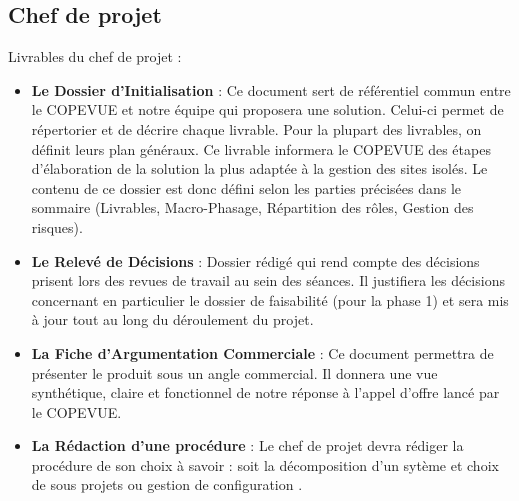     \subsection{Chef de projet}
Livrables du chef de projet :
\begin{itemize}
\item \textbf{Le Dossier d'Initialisation} : Ce document sert de référentiel commun entre le COPEVUE et notre équipe qui proposera une solution. Celui-ci permet de répertorier et de décrire chaque livrable. Pour la plupart des livrables, on définit leurs plan généraux. Ce livrable informera le COPEVUE des étapes d’élaboration de la solution la plus adaptée à la gestion des sites isolés. Le contenu de ce dossier est donc défini selon les parties précisées dans le sommaire (Livrables, Macro-Phasage, Répartition des rôles, Gestion des risques).
\item \textbf{Le Relevé de Décisions} : Dossier rédigé qui rend compte des décisions prisent lors des revues de travail au sein des séances. Il justifiera les décisions concernant en particulier le dossier de faisabilité (pour la phase 1) et sera mis à jour tout au long du déroulement du projet.
\item \textbf{La Fiche d'Argumentation Commerciale} : Ce document permettra de présenter le produit sous un angle commercial. Il donnera une vue synthétique, claire et fonctionnel de notre réponse à l'appel d'offre lancé par le COPEVUE.
\item \textbf{La Rédaction d'une procédure} : Le chef de projet devra rédiger la procédure de son choix à savoir : soit la \og décomposition d'un sytème et choix de sous projets \fg ou \og gestion de configuration \fg.
\end{itemize}

